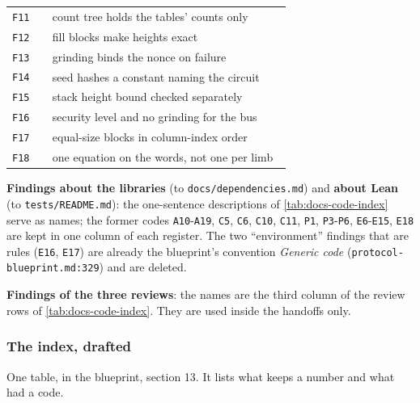 {\begin{longtable}{@{}>{\raggedright\arraybackslash}p{0.147\linewidth}>{\raggedright\arraybackslash}p{0.835\linewidth}@{}}
\texttt{F11} & count tree holds the tables' counts only \\\addlinespace[2pt]
\texttt{F12} & fill blocks make heights exact \\\addlinespace[2pt]
\texttt{F13} & grinding binds the nonce on failure \\\addlinespace[2pt]
\texttt{F14} & seed hashes a constant naming the circuit \\\addlinespace[2pt]
\texttt{F15} & stack height bound checked separately \\\addlinespace[2pt]
\texttt{F16} & security level and no grinding for the bus \\\addlinespace[2pt]
\texttt{F17} & equal-size blocks in column-index order \\\addlinespace[2pt]
\texttt{F18} & one equation on the words, not one per limb \\
\end{longtable}}

\begin{sloppypar}
\textbf{Findings about the libraries} (to \texttt{docs/\allowbreak{}dependencies.\allowbreak{}md}) and \textbf{about Lean} (to \texttt{tests/\allowbreak{}README.\allowbreak{}md}): the one-sentence descriptions of \cref{tab:docs-code-index} serve as names; the former codes \texttt{A10}-\texttt{A19}, \texttt{C5}, \texttt{C6}, \texttt{C10}, \texttt{C11}, \texttt{P1}, \texttt{P3}-\texttt{P6}, \texttt{E6}-\texttt{E15}, \texttt{E18} are kept in one column of each register. The two ``environment'' findings that are rules (\texttt{E16}, \texttt{E17}) are already the blueprint's convention \emph{Generic code} (\texttt{protocol-\allowbreak{}blueprint.\allowbreak{}md:\allowbreak{}329}) and are deleted.
\end{sloppypar}

\textbf{Findings of the three reviews}: the names are the third column of the review rows of \cref{tab:docs-code-index}. They are used inside the handoffs only.

\subsubsection{The index, drafted}\label{sec:docs-codes-index-draft}

One table, in the blueprint, section 13. It lists what keeps a number and what had a code.

